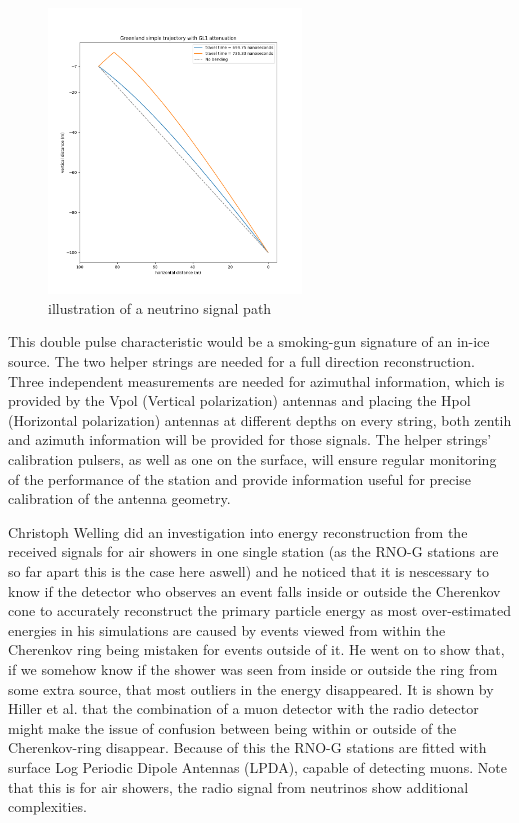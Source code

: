 \documentclass[11pt,a4paper,faculty=we,language=en,doctype=report]{cls/ugent-doc}
\begin{document}
\begin{figure}[ht]
	\centering
	\includegraphics[width=0.6\textwidth]{figures/path_illustration.png}	
	\caption{illustration of a neutrino signal path}
	\label{fig:path_illustration}
\end{figure}


This double pulse characteristic would be a smoking-gun signature of an in-ice source. The two helper strings are needed for a full direction reconstruction. Three independent measurements are needed for azimuthal information, which is provided by the Vpol (Vertical polarization) antennas and placing the Hpol (Horizontal polarization) antennas at different depths on every string, both zentih and azimuth information will be provided for those signals. The helper strings' calibration pulsers, as well as one on the surface, will ensure regular monitoring of the performance of the station and provide information useful for precise calibration of the antenna geometry.

Christoph Welling did an investigation into energy reconstruction from the received signals\cite{Welling_2019} for air showers in one single station (as the RNO-G stations are so far apart this is the case here aswell) and he noticed that it is nescessary to know if the detector who observes an event falls inside or outside the Cherenkov cone to accurately reconstruct the primary particle energy as most over-estimated energies in his simulations are caused by events viewed from within the Cherenkov ring being mistaken for events outside of it. He went on to show that, if we somehow know if the shower was seen from inside or outside the ring from some extra source, that most outliers in the energy disappeared. It is shown by Hiller et al.\cite{Hiller_2017} that the combination of a muon detector with the radio detector might make the issue of confusion between being within or outside of the Cherenkov-ring disappear. Because of this the RNO-G stations are fitted with surface Log Periodic Dipole Antennas (LPDA), capable of detecting muons.
Note that this is for air showers, the radio signal from neutrinos show additional complexities.
\end{document}
